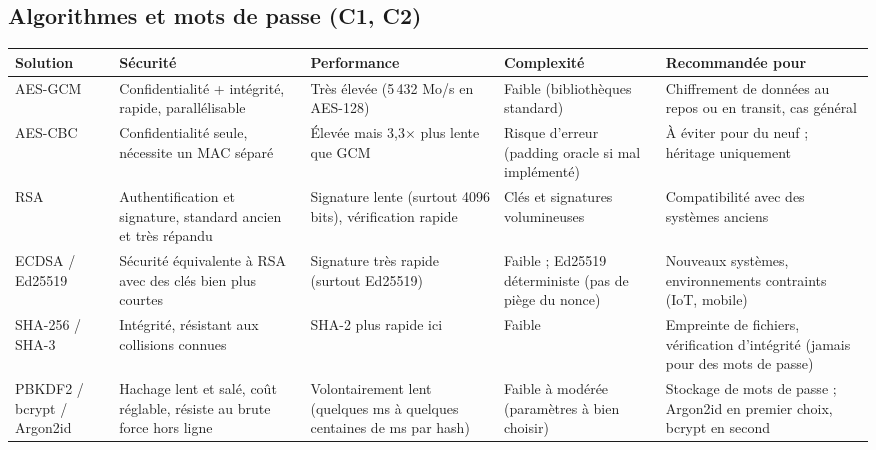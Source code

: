 \documentclass[11pt,a4paper]{article}
\begin{document}
\subsection{Algorithmes et mots de passe (C1, C2)}
\begin{table}[H]
\centering\small
\begin{tabularx}{\textwidth}{l Y Y Y Y}
\toprule
\textbf{Solution} & \textbf{Sécurité} & \textbf{Performance} & \textbf{Complexité} & \textbf{Recommandée pour} \\
\midrule
AES-GCM & Confidentialité + intégrité, rapide, parallélisable & Très élevée (5\,432 Mo/s en AES-128) & Faible (bibliothèques standard) & Chiffrement de données au repos ou en transit, cas général \\
AES-CBC & Confidentialité seule, nécessite un MAC séparé & Élevée mais 3,3$\times$ plus lente que GCM & Risque d'erreur (padding oracle si mal implémenté) & À éviter pour du neuf ; héritage uniquement \\
RSA & Authentification et signature, standard ancien et très répandu & Signature lente (surtout 4096 bits), vérification rapide & Clés et signatures volumineuses & Compatibilité avec des systèmes anciens \\
ECDSA / Ed25519 & Sécurité équivalente à RSA avec des clés bien plus courtes & Signature très rapide (surtout Ed25519) & Faible ; Ed25519 déterministe (pas de piège du nonce) & Nouveaux systèmes, environnements contraints (IoT, mobile) \\
SHA-256 / SHA-3 & Intégrité, résistant aux collisions connues & SHA-2 plus rapide ici & Faible & Empreinte de fichiers, vérification d'intégrité (jamais pour des mots de passe) \\
PBKDF2 / bcrypt / Argon2id & Hachage lent et salé, coût réglable, résiste au brute force hors ligne & Volontairement lent (quelques ms à quelques centaines de ms par hash) & Faible à modérée (paramètres à bien choisir) & Stockage de mots de passe ; Argon2id en premier choix, bcrypt en second \\
\bottomrule
\end{tabularx}
\end{table}
\end{document}
